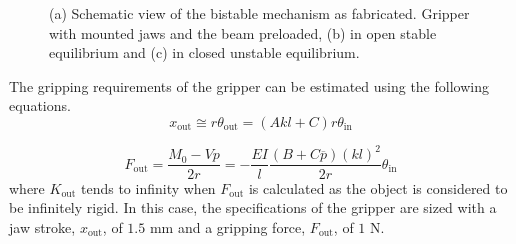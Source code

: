 \begin{figure}[hbt!] %
  \centering
  \caption[Schematic view of the bistable mechanism as fabricated]{(a) Schematic view of the bistable mechanism as fabricated. Gripper with mounted jaws and the beam preloaded, (b) in open stable equilibrium and (c) in closed unstable equilibrium.}
  \label{fig:bistable-mechanism}
\end{figure}
The gripping requirements of the gripper can be estimated using the following equations.
\begin{equation}\label{eq:x_out}
  x_\textrm{out}\cong r{\theta }_\textrm{out}=\left(A kl+C\right)r{\theta }_\textrm{in}
\end{equation}

\begin{equation}\label{eq:f_out}
  F_\textrm{out}=\frac{M_0-Vp}{2r}=-\frac{EI}{l}\frac{{\left(B+C\overline{p}\right)\left(kl\right)}^2}{2r}{\theta }_\textrm{in}
\end{equation}
where $K_\mathrm{out}$ tends to infinity when $F_\mathrm{out}$ is calculated as the object is considered to be infinitely rigid. In this case, the specifications of the gripper are sized with a jaw stroke, $x_\mathrm{out}$, of $1.5$ mm and a gripping force, $F_\mathrm{out}$, of $1$ N.

